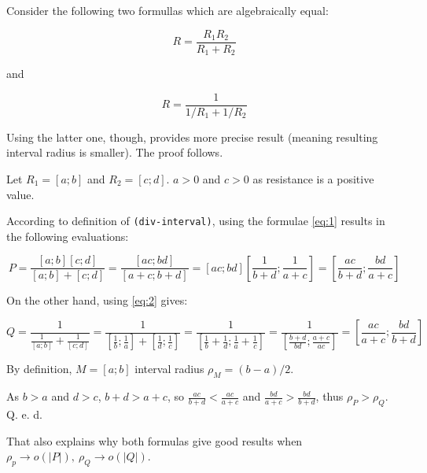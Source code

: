 \documentclass{article}
\begin{document}
Consider the following two formullas which are algebraically equal:

\begin{equation}
  \label{eq:1}
  R = \frac{R_1 R_2}{R_1 + R_2}
\end{equation}

and

\begin{equation}
  \label{eq:2}
  R = \frac{1}{1/R_1 + 1/R_2}
\end{equation}

Using the latter one, though, provides more precise result (meaning
resulting interval radius is smaller). The proof follows.

Let $R_1 = [a; b]$ and $R_2 = [c; d]$. $a > 0$ and $c > 0$ as
resistance is a positive value.

According to definition of {\tt (div-interval)}, using the formulae
\ref{eq:1} results in the following evaluations:

$$P = \frac{[a; b] [c; d]}{[a; b] + [c; d]} = \frac{[ac; bd]}{[a+c; b+d]}
= [ac; bd ] [\frac{1}{b+d}; \frac{1}{a+c}] = [\frac{ac}{b+d};
\frac{bd}{a+c}]$$

On the other hand, using \ref{eq:2} gives:

$$Q = \frac{1}{\frac{1}{[a; b]} + \frac{1}{[c; d]}} =
\frac{1}{[\frac{1}{b}; \frac{1}{a}] + [\frac{1}{d}; \frac{1}{c}]} =
\frac{1}{[\frac{1}{b} + \frac{1}{d}; \frac{1}{a} + \frac{1}{c}]} =
\frac{1}{[\frac{b+d}{bd}; \frac{a+c}{ac}]} = [\frac{ac}{a+c};
\frac{bd}{b+d}]$$

By definition, $M = [a; b]$ interval radius $\rho_M = (b - a)/2$.

As $b > a$ and $d > c$, $b + d > a + c$, so $\frac{ac}{b+d} <
\frac{ac}{a+c}$ and $\frac{bd}{a+c} > \frac{bd}{b+d}$, thus $\rho_P >
\rho_Q$.  Q. e. d.

That also explains why both formulas give good results when $\rho_p
\rightarrow o(|P|),\ \rho_Q \rightarrow o(|Q|)$.
\end{document}
